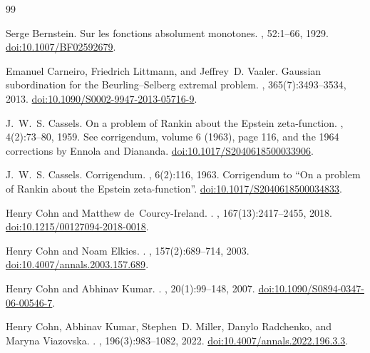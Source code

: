 \documentclass[11pt]{article}
\theoremstyle{remark}\newtheorem{remark}[theorem]{Remark}
\begin{document}
\begin{thebibliography}{99}

Serge Bernstein.
\newblock Sur les fonctions absolument monotones.
, 52:1--66, 1929.
\newblock \href{https://doi.org/10.1007/BF02592679}{doi:10.1007/BF02592679}.

Emanuel Carneiro, Friedrich Littmann, and Jeffrey~D. Vaaler.
\newblock Gaussian subordination for the {Beurling--Selberg} extremal problem.
,
  365(7):3493--3534, 2013.
\newblock \href{https://doi.org/10.1090/S0002-9947-2013-05716-9}{doi:10.1090/S0002-9947-2013-05716-9}.

J.~W.~S. Cassels.
\newblock On a problem of {Rankin} about the {Epstein} zeta-function.
,
  4(2):73--80, 1959.
\newblock See corrigendum, volume 6 (1963), page 116, and the 1964 corrections
  by Ennola and Diananda.
\newblock \href{https://doi.org/10.1017/S2040618500033906}{doi:10.1017/S2040618500033906}.

J.~W.~S. Cassels.
\newblock Corrigendum.
, 6(2):116,
  1963.
\newblock Corrigendum to ``On a problem of Rankin about the Epstein
  zeta-function''.
\newblock \href{https://doi.org/10.1017/S2040618500034833}{doi:10.1017/S2040618500034833}.

Henry Cohn and Matthew de~Courcy-Ireland.
.
, 167(13):2417--2455, 2018.
\newblock \href{https://doi.org/10.1215/00127094-2018-0018}{doi:10.1215/00127094-2018-0018}.

Henry Cohn and Noam Elkies.
.
, 157(2):689--714, 2003.
\newblock \href{https://doi.org/10.4007/annals.2003.157.689}{doi:10.4007/annals.2003.157.689}.

Henry Cohn and Abhinav Kumar.
.
, 20(1):99--148,
  2007.
\newblock \href{https://doi.org/10.1090/S0894-0347-06-00546-7}{doi:10.1090/S0894-0347-06-00546-7}.

Henry Cohn, Abhinav Kumar, Stephen~D. Miller, Danylo Radchenko, and Maryna
  Viazovska.
.
, 196(3):983--1082, 2022.
\newblock \href{https://doi.org/10.4007/annals.2022.196.3.3}{doi:10.4007/annals.2022.196.3.3}.


\end{thebibliography}
\end{document}
